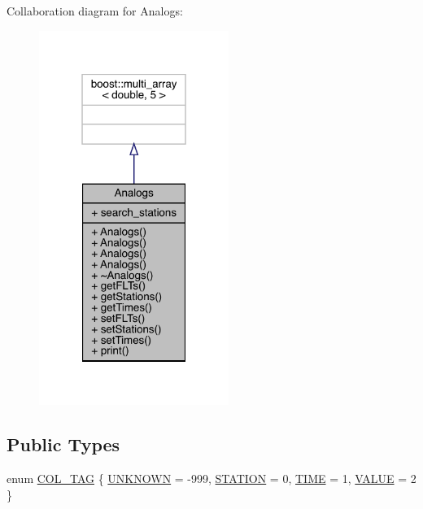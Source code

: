 Collaboration diagram for Analogs\+:
\nopagebreak
\begin{figure}[H]
\begin{center}
\leavevmode
\includegraphics[width=175pt]{class_analogs__coll__graph}
\end{center}
\end{figure}
\subsection*{Public Types}
\begin{DoxyCompactItemize}
\item 
enum \mbox{\hyperlink{class_analogs_a9b56dcdb212f44c3ba40a60736d648bb}{C\+O\+L\+\_\+\+T\+AG}} \{ \mbox{\hyperlink{class_analogs_a9b56dcdb212f44c3ba40a60736d648bba5a08d0e60f9a619e16546d744854c670}{U\+N\+K\+N\+O\+WN}} = -\/999, 
\mbox{\hyperlink{class_analogs_a9b56dcdb212f44c3ba40a60736d648bbad9315e6d921f3bc928effd909dd0d67b}{S\+T\+A\+T\+I\+ON}} = 0, 
\mbox{\hyperlink{class_analogs_a9b56dcdb212f44c3ba40a60736d648bba64d8ac114131a39195bc644f3fb0f084}{T\+I\+ME}} = 1, 
\mbox{\hyperlink{class_analogs_a9b56dcdb212f44c3ba40a60736d648bba28a85fd8dc593df26ed8d479a2745051}{V\+A\+L\+UE}} = 2
 \}
\end{DoxyCompactItemize}
